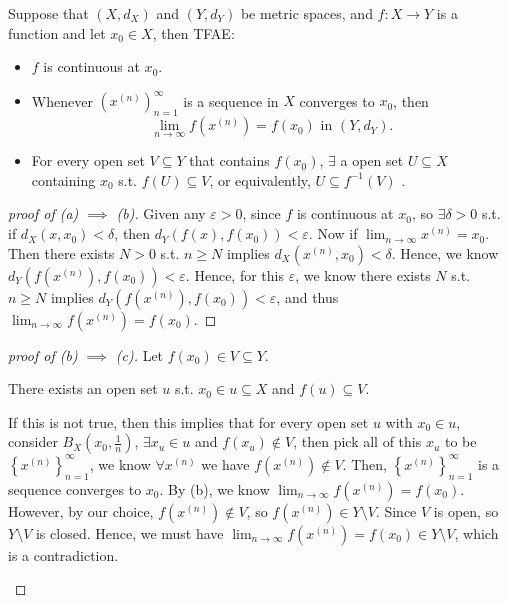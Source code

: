 \begin{theorem} \label{thm: continuous TFAE 1}
    Suppose that \((X, d_X)\) and \((Y, d_Y)\) be metric spaces, and \(f:X \to Y\) is a function and let \(x_0 \in X\), then TFAE: 
    \begin{itemize}
        \item [(a)] \(f\) is continuous at \(x_0\).  
        \item [(b)] Whenever \(\left( x^{(n)} \right)_{n=1}^{\infty}  \) is a sequence in \(X\) converges to \(x_0\), then 
        \[
            \lim_{n \to \infty} f \left( x^{(n)} \right) = f(x_0) \text{ in } \left( Y, d_Y \right).   
        \]
        \item [(c)] For every open set \(V \subseteq Y\) that contains \(f(x_0)\), \(\exists \) a open set \(U \subseteq X\) containing \(x_0\) s.t. \(f(U) \subseteq V\), or equivalently, \(U \subseteq f^{-1}(V)\) .      
    \end{itemize}  
\end{theorem}
\begin{proof}[proof of (a) \(\implies \) (b)]
    Given any \(\varepsilon > 0\), since \(f\) is continuous at \(x_0\), so \(\exists \delta > 0\) s.t. if \(d_X(x, x_0) < \delta \), then \(d_Y (f(x), f(x_0)) < \varepsilon \). Now if \(\lim_{n \to \infty} x^{(n)} = x_0 \). Then there exists \(N > 0\) s.t. \(n \ge N\) implies \(d_X \left( x^{(n)}, x_0 \right) < \delta  \). Hence, we know \(d_Y \left( f \left( x^{(n)}\right),f(x_0)   \right) < \varepsilon \). Hence, for this \(\varepsilon \), we know there exists \(N\) s.t. \(n \ge N\) implies \(d_Y \left( f \left( x^{(n)} \right), f(x_0)  \right) < \varepsilon  \), and thus \(\lim_{n \to \infty} f \left( x^{(n)} \right) = f(x_0)  \).         
\end{proof}
\begin{proof}[proof of (b) \(\implies \) (c)]
    Let \(f(x_0) \in V \subseteq Y\).
    \begin{claim}
        There exists an open set \(u\) s.t. \(x_0 \in u \subseteq X\) and \(f(u) \subseteq V\).   
    \end{claim}
    \begin{explanation}
        If this is not true, then this implies that for every open set \(u\) with \(x_0 \in u\), consider \(B_X \left( x_0, \frac{1}{n} \right) \), \(\exists x_u \in u\) and \(f(x_u) \notin V\), then pick all of this \(x_u\) to be \(\left\{ x^{(n)} \right\}_{n=1}^{\infty}  \), we know \(\forall x^{(n)}\) we have \(f \left( x^{(n)} \right) \notin V \).    
        Then, \(\left\{ x^{(n)} \right\}_{n=1}^{\infty}  \) is a sequence converges to \(x_0\). By (b), we know \(\lim_{n \to \infty} f \left( x^{(n)} \right) = f(x_0)  \). However, by our choice, \(f \left( x^{(n)} \right) \notin V \), so \(f \left( x^{(n)} \right) \in Y \setminus V \). Since \(V\) is open, so \(Y\setminus V\) is closed. Hence, we must have \(\lim_{n \to \infty} f \left( x^{(n)} \right) = f(x_0) \in Y \setminus V  \), which is a contradiction. 
    \end{explanation}
\end{proof}
